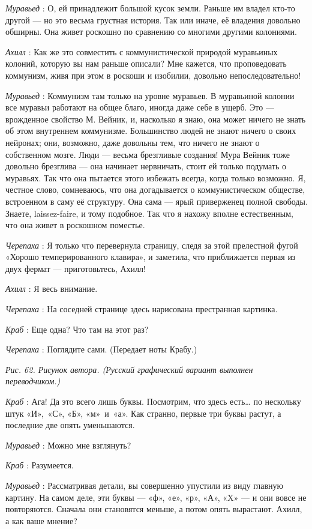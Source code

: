 \documentclass[../main.tex]{subfiles}
\begin{document}
\begin{dialogue}
\emph{Муравьед} : О, ей принадлежит большой кусок земли. Раньше им владел кто-то другой --- но это весьма грустная история. Так или иначе, её владения довольно обширны. Она живет роскошно по сравнению со многими другими колониями.

\emph{Ахилл} : Как же это совместить с коммунистической природой муравьиных колоний, которую вы нам раньше описали? Мне кажется, что проповедовать коммунизм, живя при этом в роскоши и изобилии, довольно непоследовательно!

\emph{Муравьед} : Коммунизм там только на уровне муравьев. В муравьиной колонии все муравьи работают на общее благо, иногда даже себе в ущерб. Это --- врожденное свойство М. Вейник, и, насколько я знаю, она может ничего не знать об этом внутреннем коммунизме. Большинство людей не знают ничего о своих нейронах; они, возможно, даже довольны тем, что ничего не знают о собственном мозге. Люди --- весьма брезгливые создания! Мура Вейник тоже довольно брезглива --- она начинает нервничать, стоит ей только подумать о муравьях. Так что она пытается этого избежать всегда, когда только возможно. Я, честное слово, сомневаюсь, что она догадывается о коммунистическом обществе, встроенном в саму её структуру. Она сама --- ярый приверженец полной свободы. Знаете, laissez-faire, и тому подобное. Так что я нахожу вполне естественным, что она живет в роскошном поместье.

\emph{Черепаха} : Я только что перевернула страницу, следя за этой прелестной фугой «Хорошо темперированного клавира», и заметила, что приближается первая из двух фермат --- приготовьтесь, Ахилл!

\emph{Ахилл} : Я весь внимание.

\emph{Черепаха} : На соседней странице здесь нарисована престранная картинка.

\emph{Краб} : Еще одна? Что там на этот раз?

\emph{Черепаха} : Поглядите сами. (Передает ноты Крабу.)

\emph{Рис. 62. Рисунок автора. (Русский графический вариант выполнен переводчиком.)}

\emph{Краб} : Ага! Да это всего лишь буквы. Посмотрим, что здесь есть\ldots{} по нескольку штук «И»,~«С», «Б», «м»~и~«а». Как странно, первые три буквы растут, а последние две опять уменьшаются.

\emph{Муравьед} : Можно мне взглянуть?

\emph{Краб} : Разумеется.

\emph{Муравьед} : Рассматривая детали, вы совершенно упустили из виду главную картину. На самом деле, эти буквы --- «ф», «е», «р», «А», «X» --- и они вовсе не повторяются. Сначала они становятся меньше, а потом опять вырастают. Ахилл, а как ваше мнение?


\end{dialogue}
\end{document}
